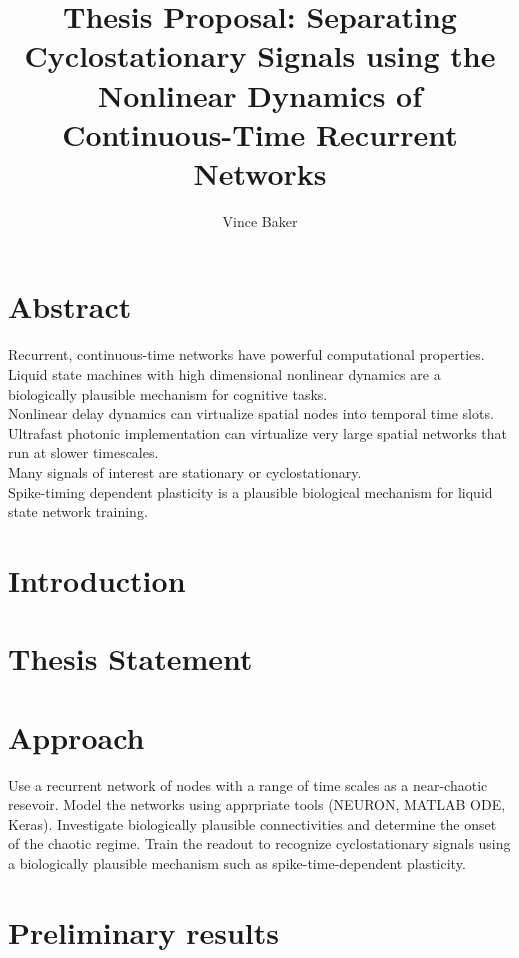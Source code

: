 \documentclass[a4paper,11pt]{article}
\title{Thesis Proposal: Separating Cyclostationary Signals using the Nonlinear Dynamics of Continuous-Time Recurrent Networks}
\author{Vince Baker}
\numberwithin{equation}{section}
\begin{document}
\maketitle

\section{Abstract}
Recurrent, continuous-time networks have powerful computational properties. \\
Liquid state machines with high dimensional nonlinear dynamics are a biologically plausible mechanism for cognitive tasks. \\
Nonlinear delay dynamics can virtualize spatial nodes into temporal time slots. \\
Ultrafast photonic implementation can virtualize very large spatial networks that run at slower timescales. \\
Many signals of interest are stationary or cyclostationary.\\
Spike-timing dependent plasticity is a plausible biological mechanism for liquid state network training.\\



\section{Introduction} 

\section{Thesis Statement}

\section{Approach}
Use a recurrent network of nodes with a range of time scales as a near-chaotic resevoir.
Model the networks using apprpriate tools (NEURON, MATLAB ODE, Keras).
Investigate biologically plausible connectivities and determine the onset of the chaotic regime.
Train the readout to recognize cyclostationary signals using a biologically plausible mechanism such as spike-time-dependent plasticity.


\section{Preliminary results}
\end{document}

